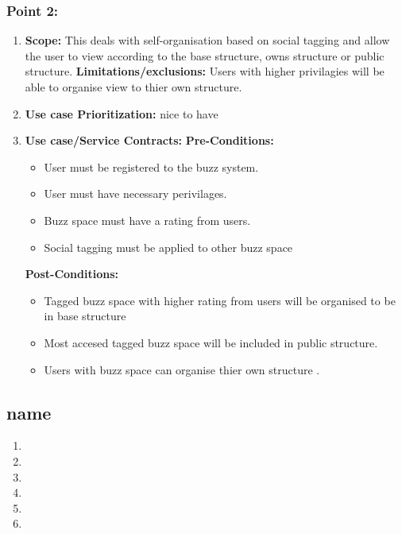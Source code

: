 \documentclass[11pt]{article}
\begin{document}
\subsubsection{Point 2:} 
\begin{enumerate}
\item 
\textbf{Scope:}
This deals with  self-organisation based on social tagging and allow the user to view according to the base structure, owns structure or public structure.
\newline
\textbf{Limitations/exclusions:} 
Users with higher privilagies will be able to organise view to thier own structure.
\item 
\textbf{Use case Prioritization:} nice to have

\item 
\textbf{Use case/Service Contracts:} 
\newline
\textbf{Pre-Conditions: }
\begin{itemize}
\item User must be registered to the buzz system.
\item User must have necessary perivilages.
\item Buzz space must have a rating from users.
\item Social tagging must be applied to other buzz space
\end{itemize}
 

\textbf{Post-Conditions: }
\begin{itemize}
\item Tagged buzz space with higher rating from users will be organised to be in base structure
\item Most accesed tagged buzz space will be included in public structure.
\item Users with buzz space can organise thier own structure .
\end{itemize}
\end{enumerate}

\newpage

\subsection{name}
\begin{enumerate}
\item 
\item 
\item 
\item 
\item 
\item 
\end{enumerate}
\end{document}
